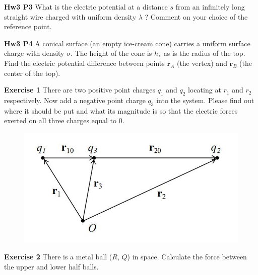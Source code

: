 \documentclass{beamer}
\begin{document}
\begin{frame}{\bf Hw3 P3}
    What is the electric potential at a distance $s$ from an infinitely long straight wire charged with uniform density $\lambda$ ? Comment on your choice of the reference point.
\end{frame}

\begin{frame}{\bf Hw3 P4}
    A conical surface (an empty ice-cream cone) carries a uniform surface charge with density $\sigma$. The height of the cone is $h,$ as is the radius of the top. Find the electric potential difference between points $\mathbf{r}_{A}$ (the vertex) and $\mathbf{r}_{B}$ (the center of the top).
\end{frame}


\begin{frame}{\bf Exercise 1}
There are two positive point charges $q_1$ and $q_2$ locating at 
$r_1$ and $r_2$ respectively. Now add a negative point charge $q_3$ 
into the system. Please find out where it should be put and 
what its magnitude is so that the electric forces exerted on 
all three charges equal to 0.

\begin{figure}[htbp]
    \centering
    \includegraphics[scale = 0.8]{images/EF_1.jpg}
\end{figure}
\end{frame}


\begin{frame}{\bf Exercise 2}
There is a metal ball ($R$, $Q$) in space. Calculate the force between the upper and lower half balls.

\begin{figure}[htbp]
    \centering
\end{figure}
\end{frame}
\end{document}
